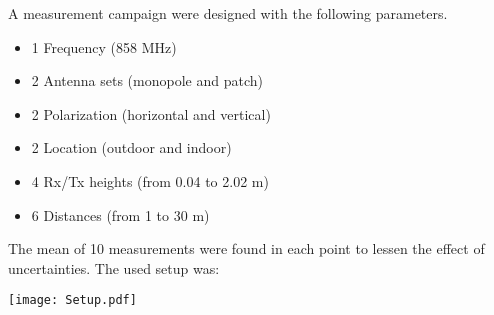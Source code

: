 \large
A measurement campaign were designed with the following parameters.
\begin{itemize}\itemsep0em
\item 1 Frequency (858 MHz)
\item 2 Antenna sets (monopole and patch)
\item 2 Polarization (horizontal and vertical)
\item 2 Location (outdoor and indoor)
\item 4 Rx/Tx heights (from 0.04 to 2.02 m)
\item 6 Distances (from 1 to 30 m)
\end{itemize}
The mean of 10 measurements were found in each point to lessen the effect of uncertainties. The used setup was:
\begin{center}
\texttt{[image: Setup.pdf]}
\end{center}
